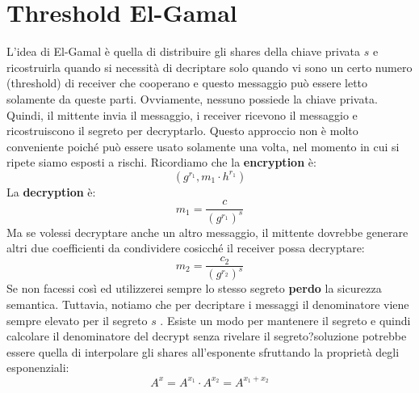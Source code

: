 \documentclass{book}
\begin{document}
\section{Threshold El-Gamal}
L'idea di El-Gamal è quella di distribuire gli shares della chiave privata \(s\) e ricostruirla quando si necessità di decriptare solo quando vi sono un certo numero (threshold) di receiver che cooperano e questo messaggio può essere letto solamente da queste parti\@. Ovviamente, nessuno possiede la chiave privata\@.\newline
Quindi, il mittente invia il messaggio, i receiver ricevono il messaggio e ricostruiscono il segreto per decryptarlo\@. Questo approccio non è molto conveniente poiché può essere usato solamente una volta, nel momento in cui si ripete siamo esposti a rischi\@.\newline
Ricordiamo che la \textbf{encryption} è:\begin{equation*}
    (g^{r_{1}},m_{1}\cdot h^{r_{1}})
\end{equation*}
La \textbf{decryption} è:\begin{equation*}
    m_{1}=\frac{c}{{(g^{r_{1}})}^{s}}
\end{equation*}
Ma se volessi decryptare anche un altro messaggio, il mittente dovrebbe generare altri due coefficienti da condividere cosicché il receiver possa decryptare:\begin{equation*}
    m_{2}=\frac{c_{2}}{{(g^{r_{2}})}^{s}}
\end{equation*}
Se non facessi così ed utilizzerei sempre lo stesso segreto \textbf{perdo} la sicurezza semantica\@. Tuttavia, notiamo che per decriptare i messaggi il denominatore viene sempre elevato per il segreto \(s\) \@. Esiste un modo per mantenere il segreto e quindi calcolare il denominatore del decrypt senza rivelare il segreto?\@Una soluzione potrebbe essere quella di interpolare gli shares all'esponente sfruttando la proprietà degli esponenziali:\begin{equation*}
    A^{x}=A^{x_{1}}\cdot A^{x_{2}}=A^{x_{1}+x_{2}}
\end{equation*}
\newpage
\end{document}
